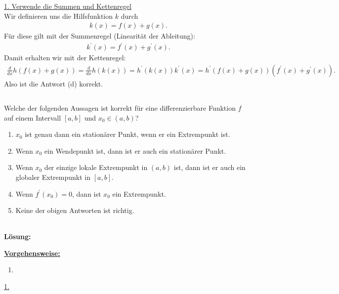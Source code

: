 \underline{1. Verwende die Summen und Kettenregel}\\
Wir definieren uns die Hilfsfunktion $k$ durch
\begin{align*}
	k(x) = f(x) + g(x).
\end{align*}
Für diese gilt mit der Summenregel (Linearität der Ableitung):
\begin{align*}
	k^\prime(x) = f^\prime(x) + g^\prime(x).
\end{align*}
Damit erhalten wir mit der Kettenregel:
\begin{align*}
	\frac{d}{dx}h(f(x) + g(x))
	=
	\frac{d}{dx}h(k(x))
	=
	h^\prime(k(x)) k^\prime(x)
	=
	h^\prime(f(x) + g(x)) (f^\prime(x) + g^\prime(x)).
\end{align*}
Also ist die Antwort (d) korrekt.


\newpage
\subsection*{}
Welche der folgenden Aussagen ist korrekt für eine differenzierbare Funktion $f$ auf einem Intervall $[a,b]$ und $x_0 \in (a,b)$?
\renewcommand{\labelenumi}{(\alph{enumi})}
\begin{enumerate}
	\item 
	$x_0$ ist genau dann ein stationärer Punkt, wenn er ein Extrempunkt ist.
	\item
	Wenn $x_0$ ein Wendepunkt ist, dann ist er auch ein stationärer Punkt.
	\item
	Wenn $x_0$ der einzige lokale Extrempunkt in $(a,b)$ ist, dann ist er auch ein globaler Extrempunkt in $[a,b]$.
	\item
	Wenn $f^\prime(x_0) = 0$, dann ist $x_0$ ein Extrempunkt.
	\item
	Keine der obigen Antworten ist richtig.
\end{enumerate}
\ \\
\textbf{Lösung:}
\begin{mdframed}
\underline{\textbf{Vorgehensweise:}}
\renewcommand{\labelenumi}{\theenumi.}
\begin{enumerate}
\item 
\end{enumerate}
\end{mdframed}

\underline{1. }\\




\newpage

